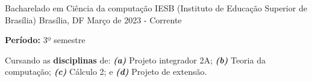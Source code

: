 

\begin{cventries}

  \cventry
    {Bacharelado em Ciência da computação} %
    {IESB (Instituto de Educação Superior de Brasília)} %
    {Brasília, DF} %
    {Março de 2023 - Corrente} %
    {
      \begin{cvitems} %
        \item {\textbf{Período:} 3º semestre}
        \item {Cursando as \textbf{disciplinas} de: \textbf{\textit{(a)}} Projeto integrador 2A; \textbf{\textit{(b)}} Teoria da computação; \textbf{\textit{(c)}} Cálculo 2; e \textbf{\textit{(d)}} Projeto de extensão.}
      \end{cvitems}
    }

\end{cventries}

